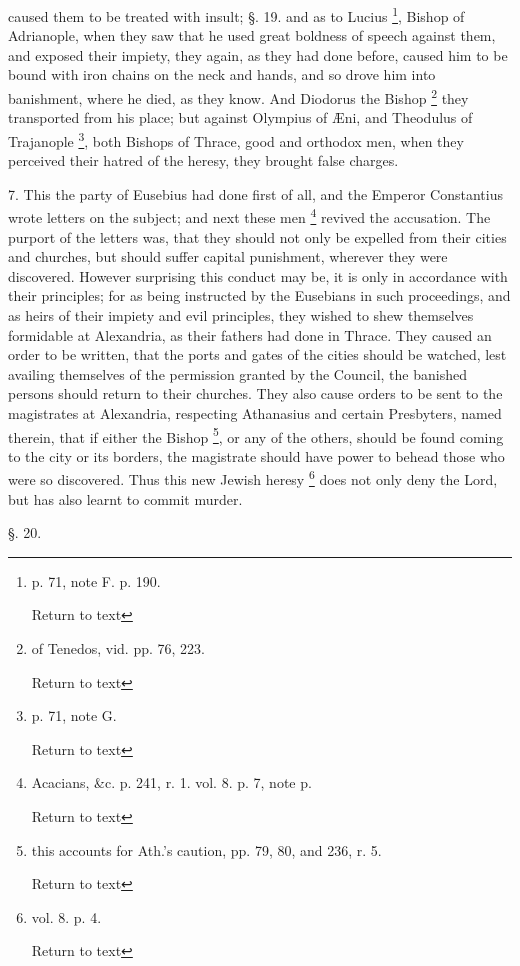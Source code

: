 caused them to be treated with insult; §. 19. and as to Lucius \footnote{p. 71, note F. p. 190.

Return to text}, Bishop of Adrianople, when they saw that he used great
boldness of speech against them, and exposed their impiety, they
again, as they had done before, caused him to be bound with iron
chains on the neck and hands, and so drove him into banishment, where
he died, as they know. And Diodorus the Bishop \footnote{of Tenedos, vid. pp. 76, 223.

Return to text} they transported from his place; but against Olympius of Æni,
and Theodulus of Trajanople \footnote{p. 71, note G.

Return to text}, both Bishops of Thrace, good and orthodox men, when they
perceived their hatred of the heresy, they brought false charges.

7. This the party of Eusebius had done first of
all, and the Emperor Constantius wrote letters on the subject; and
next these men \footnote{Acacians, \&c. p. 241, r. 1. vol. 8. p. 7, note p.

Return to text}
revived the accusation. The purport of the letters was, that they
should not only be expelled from their cities and churches, but should
suffer capital punishment, wherever they were discovered. However
surprising this conduct may be, it is only in accordance with their
principles; for as being instructed by the Eusebians in such
proceedings, and as heirs of their impiety and evil principles, they
wished to shew themselves formidable at Alexandria, as their fathers
had done in Thrace. They caused an order to be written, that the ports
and gates of the cities should be watched, lest availing themselves of
the permission granted by the Council, the banished persons should
return to their churches. They also cause orders to be sent to the
magistrates at Alexandria, respecting Athanasius and certain
Presbyters, named therein, that if either the Bishop \footnote{this accounts for Ath.'s caution, pp. 79, 80, and 236, r. 5.

Return to text}, or any of the others, should be found coming to the city or
its borders, the magistrate should have power to behead those who were
so discovered. Thus this new Jewish heresy \footnote{vol. 8. p. 4.

Return to text} does not only deny the Lord, but has also learnt to commit
murder.

§. 20.


